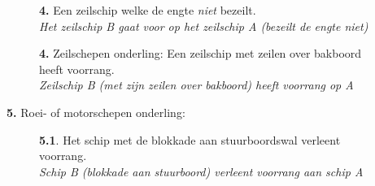 \begin{figure}[H]
	\centering
	\hspace{0.02\textwidth}
	\begin{minipage}[t]{0.70\textwidth}
		\textbf{4.} Een zeilschip welke de engte \textit{niet} bezeilt.\\
		\textit{Het zeilschip B gaat voor op het zeilschip A (bezeilt de engte niet)}
	\end{minipage}
	\hfill
	\begin{minipage}[t]{0.25\textwidth}
		\label{pic:engte:6}
	\end{minipage}
	\hfill
\end{figure}
\vspace{-0.7cm}
\begin{figure}[H]
	\centering
	\begin{minipage}[t]{0.70\textwidth}
		\textbf{4.} Zeilschepen onderling: Een zeilschip met zeilen over bakboord heeft voorrang.\\
		\textit{Zeilschip B (met zijn zeilen over bakboord) heeft voorrang op A}
	\end{minipage}
	\hfill
	\begin{minipage}[t]{0.25\textwidth}
		\label{pic:tegen:7}
	\end{minipage}
	\hfill
\end{figure}
\vspace{-0.5cm}
\textbf{5.} Roei- of motorschepen onderling:
\vspace{-0.5cm}
\begin{figure}[H]
	\centering
	\hspace{0.02\textwidth}
	\begin{minipage}[t]{0.70\textwidth}
		\textbf{5.1}. Het schip met de blokkade aan stuurboordswal verleent voorrang.\\
		\textit{Schip B (blokkade aan stuurboord) verleent voorrang aan schip A}
	\end{minipage}
	\hfill
	\begin{minipage}[t]{0.25\textwidth}
		\label{pic:engte:9}
	\end{minipage}
	\hfill
\end{figure}


